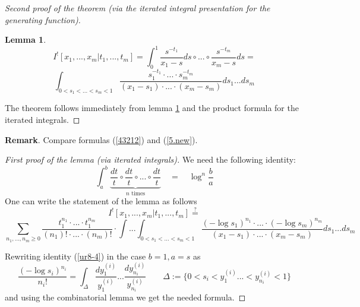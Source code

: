 \documentclass[10pt]{article}
\newtheorem{lemma}[theorem]{Lemma}
\begin{document}
\begin{proof}[Second proof of the theorem (via the iterated integral presentation for the generating function)]


\begin{lemma} \label{iterfpse}
\begin{equation} \label{43212}
I^![x_1,...,x_m|t_1,...,t_m] = \int_0^1\frac{ s^{-t_1}}{x_1 -
  s}ds \circ ... \circ \frac{s^{-t_m}}{x_m - s}ds =
\end{equation}
$$
\int_{0 < s_1 < ... < s_m < 1}\frac{s_1^{-t_1} \cdot ... \cdot
  s_m^{-t_m}}{(x_1 - s_1) \cdot ... \cdot (x_m - s_m)}ds_1 ... ds_m
$$
\end{lemma}

The theorem follows immediately  from lemma \ref{iterfpse} and
the product formula for the iterated integrals.


\end{proof}

{\bf Remark}. Compare formulas (\ref{43212}) and (\ref{5.new}). 

\begin{proof}[First proof of the lemma (via iterated integrals)] We need the following identity:
\begin{equation} \label{ur8-4}
\int_a^b \underbrace{\frac{dt}{t} \circ \frac{dt}{t}\circ  ... \circ \frac{dt}{t}}_{\mbox{$n$ times}} \quad = \quad \log^n\frac{b}{a} 
\end{equation}
One can
write the statement of the lemma  as follows
$$
I^![x_1,...,x_m|t_1,...,t_m] \stackrel{?}{= }
$$
$$
\sum_{n_1,...,n_m
  \geq 0}\frac{t_1^{n_1} \cdot ... \cdot t_1^{n_m}}{(n_1)!
  \cdot ... \cdot (n_m)!} \cdot \int ... \int_{0 < s_1 < ... <
  s_m < 1}\frac{(-\log 
  s_1)^{n_1} \cdot ... \cdot (-\log s_m)^{n_m} }{(x_1 -
  s_1) \cdot ... \cdot (x_m - s_m)}ds_1 ... ds_m
$$

Rewriting identity (\ref{ur8-4}) in the case $b=1, a=s$ as 
$$
\frac{(-\log s_i)^{n_i}}{n_i!} = \int_{\Delta}\frac{d y^{(i)}_1}{y^{(i)}_1} 
  ...  \frac{d y^{(i)}_{n_i}}{y^{(i)}_{n_i}} \qquad \Delta:= \{0 < s_i < y^{(i)}_1
  ... < y^{(i)}_{n_i} < 1\}
$$ 
and using the combinatorial lemma we get the needed formula.


\end{proof}
\end{document}
